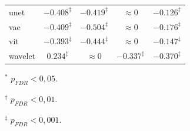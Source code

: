 \begin{table}[htbp]
\begin{threeparttable}
{\begin{tabular}{lcccc}
unet & $-0.408^{\ddagger}$ & $-0.419^{\ddagger}$ & $\approx 0$ & $-0.126^{\ddagger}$ \\
vae & $-0.409^{\ddagger}$ & $-0.504^{\ddagger}$ & $\approx 0$ & $-0.176^{\ddagger}$ \\
vit & $-0.393^{\ddagger}$ & $-0.444^{\ddagger}$ & $\approx 0$ & $-0.147^{\ddagger}$ \\
wavelet & $0.234^{\ddagger}$ & $\approx 0$ & $-0.337^{\ddagger}$ & $-0.370^{\ddagger}$ \\
\bottomrule
\end{tabular}
}
\begin{tablenotes}
\scriptsize
\item $^{*}$ $p_{FDR}<0{,}05$.
\item $^{\dagger}$ $p_{FDR}<0{,}01$.
\item $^{\ddagger}$ $p_{FDR}<0{,}001$.
\end{tablenotes}
\end{threeparttable}
\end{table}
